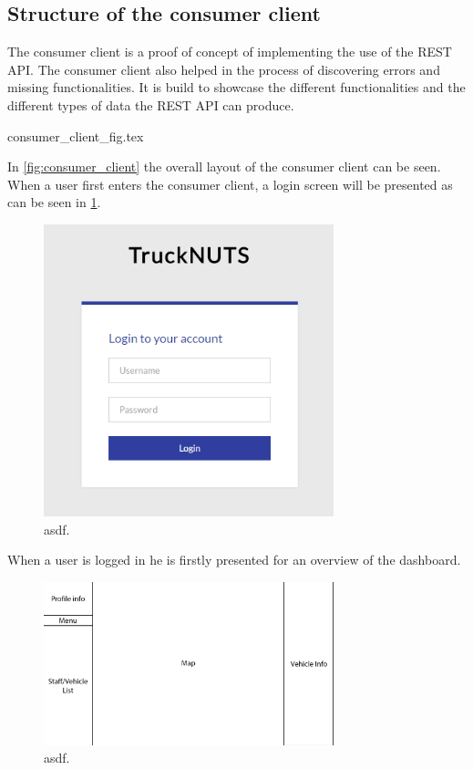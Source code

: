 \subsection{Structure of the consumer client}\label{ssec:consumer_client_structure}
The consumer client is a proof of concept of implementing the use of the REST API.
The consumer client also helped in the process of discovering errors and missing functionalities.
It is build to showcase the different functionalities and the different types of data the REST API can produce.

{consumer_client_fig.tex}

In \cref{fig:consumer_client} the overall layout of the consumer client can be seen.
When a user first enters the consumer client, a login screen will be presented as can be seen in \cref{fig:ConsumerClientLogin}.
\begin{figure}[h]
    \centering
    \includegraphics[width=0.75\textwidth]{img/ConsumerClientLogin.png}
    \caption{asdf.}
    \label{fig:ConsumerClientLogin}
\end{figure}

\bigskip
When a user is logged in he is firstly presented for an overview of the dashboard.

\begin{figure}[h]
    \centering
    \includegraphics[width=0.75\textwidth]{img/ConsumerClientWText.png}
    \caption{asdf.}
    \label{fig:ConsumerClientLayout}
\end{figure}

